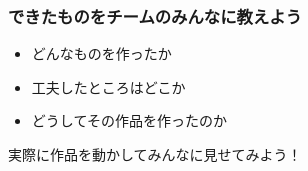 \begin{frame}[fragile]
    \frametitle{できたものをチームのみんなに教えよう}
    \begin{center}
        \begin{itemize}
            \item どんなものを作ったか
            \item 工夫したところはどこか
            \item どうしてその作品を作ったのか
        \end{itemize}
    \end{center}
    {実際に作品を動かしてみんなに見せてみよう！}
\end{frame}
